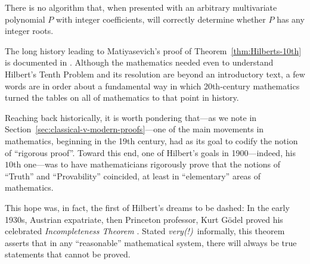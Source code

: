 \begin{theorem}
\label{thm:Hilberts-10th}
There is no algorithm that, when presented with an arbitrary
multivariate polynomial $P$ with integer coefficients, will correctly
determine whether $P$ has any integer roots.
\end{theorem}

The long history leading to Matiyasevich's proof of
Theorem~\ref{thm:Hilberts-10th} is documented in
\cite{Davis73,DavisH73,DavisMR76,Matiyasevich93}.  Although the
mathematics needed even to understand Hilbert's Tenth Problem and its
resolution are beyond an introductory text, a few words are in order
about a fundamental way in which 20th-century mathematics turned the
tables on all of mathematics to that point in history.

\medskip

Reaching back historically, it is worth pondering that---as we note in
Section~\ref{sec:classical-v-modern-proofs}---one of the main
movements in mathematics, beginning in the 19th century, had as its
goal to codify the notion of ``rigorous proof''.  Toward this end, one
of Hilbert's goals in 1900---indeed, his $10$th one---was to have
mathematicians rigorously prove that the notions of ``Truth'' and
``Provability'' coincided, at least in ``elementary'' areas of
mathematics.

\smallskip

This hope was, in fact, the first of Hilbert's dreams to be dashed: In
the early 1930s, Austrian expatriate, then Princeton professor, Kurt
G\"{o}del  proved his celebrated {\it
  Incompleteness Theorem} \cite{Goedel31}.
Stated {\em very(!)}~informally, this theorem asserts that in any
``reasonable'' mathematical system, there will always be {\sc true}
statements that cannot be proved.

\bigskip

\noindent {}
\bigskip

